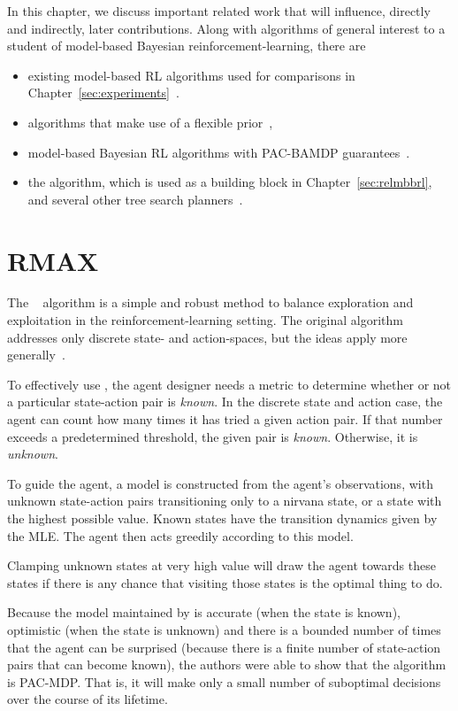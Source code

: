 
In this chapter, we discuss important related work that will influence, directly and indirectly, later contributions. Along with algorithms of general interest to a student of model-based Bayesian reinforcement-learning, there are
\begin{itemize}
\item existing model-based RL algorithms used for comparisons in Chapter~\ref{sec:experiments}~\cite{brafman03,jong07}.
\item algorithms that make use of a flexible prior~\cite{strens00,wang05,sorg10,araya2012near},
\item model-based Bayesian RL algorithms with PAC-BAMDP guarantees~\cite{kolter09,sorg10,araya2012near}.
\item the  algorithm, which is used as a building block in Chapter~\ref{sec:relmbbrl}, and several other tree search planners~\cite{kearns99,kocsis06}.
\end{itemize}

\section{RMAX}

The ~\cite{brafman03} algorithm is a simple and robust method to balance exploration and exploitation in the reinforcement-learning setting. The original algorithm addresses only discrete state- and action-spaces, but the ideas apply more generally~\cite{nouri09,jong07}.

To effectively use , the agent designer needs a metric to determine whether or not a particular state-action pair is \emph{known}. In the discrete state and action case, the agent can count how many times it has tried a given action pair. If that number exceeds a predetermined threshold, the given pair is \emph{known}. Otherwise, it is \emph{unknown}.

To guide the  agent, a model is constructed from the agent's observations, with unknown state-action pairs transitioning only to a nirvana state, or a state with the highest possible value. Known states have the transition dynamics given by the MLE. The agent then acts greedily according to this model.

Clamping unknown states at very high value will draw the agent towards these states if there is any chance that visiting those states is the optimal thing to do.

Because the model maintained by  is accurate (when the state is known), optimistic (when the state is unknown) and there is a bounded number of times that the agent can be surprised (because there is a finite number of state-action pairs that can become known), the authors were able to show that the algorithm is PAC-MDP. That is, it will make only a small number of suboptimal decisions over the course of its lifetime.

